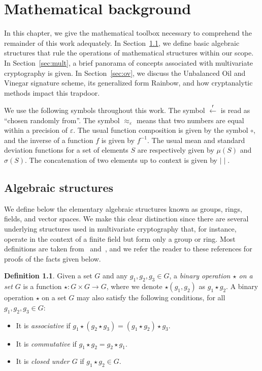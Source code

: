 \documentclass[12pt, a4paper, oneside]{memoir}
\newcommand{\random}{\overset{\mathsf{r}}{\gets}}
\theoremstyle{definition}
\newtheorem{definition}[theorem]{Definition}
\begin{document}
\chapter{Mathematical background}\label{ch:math}

In this chapter, we give the mathematical toolbox necessary to comprehend the remainder of this work adequately. In Section~\ref{sec:algebra}, we define basic algebraic structures that rule the operations of mathematical structures within our scope. In Section~\ref{sec:mult}, a brief panorama of concepts associated with multivariate cryptography is given. In Section~\ref{sec:ov}, we discuss the Unbalanced Oil and Vinegar signature scheme, its generalized form Rainbow, and how cryptanalytic methods impact this trapdoor.

We use the following symbols throughout this work. The symbol $\random$ is read as ``chosen randomly from''. The symbol $\approx_{\varepsilon}$ means that two numbers are equal within a precision of $\varepsilon$. The usual function composition is given by the symbol $\circ$, and the inverse of a function $f$ is given by $f^{-1}$. The usual mean and standard deviation functions for a set of elements $S$ are respectively given by $\mu(S)$ and $\sigma(S)$. The concatenation of two elements up to context is given by $\mid\mid$.

\section{Algebraic structures}\label{sec:algebra}

We define below the elementary algebraic structures known as groups, rings, fields, and vector spaces. We make this clear distinction since there are several underlying structures used in multivariate cryptography that, for instance, operate in the context of a finite field but form only a group or ring. Most definitions are taken from~\cite{Dummit:2003} and~\cite{Mullen:2013}, and we refer the reader to these references for proofs of the facts given below.

\begin{definition}
  Given a set $G$ and any $g_{1}, g_{2}, g_{3} \in G$, a \emph{binary operation $\star$ on a set $G$} is a function $\star : G \times G \to G$, where we denote $\star(g_{1}, g_{2})$ as $g_{1} \star g_{2}$. A binary operation $\star$ on a set $G$ may also satisfy the following conditions, for all $g_{1}, g_{2}, g_{3} \in G$:

  \begin{itemize}
    \item It is \emph{associative} if $g_{1} \star (g_{2} \star g_{3}) = (g_{1} \star g_{2}) \star g_{3}$.
    \item It is \emph{commutative} if $g_{1} \star g_{2} = g_{2} \star g_{1}$.
    \item It is \emph{closed under $G$} if $g_{1} \star g_{2} \in G$.
  \end{itemize}
\end{definition}
\end{document}

